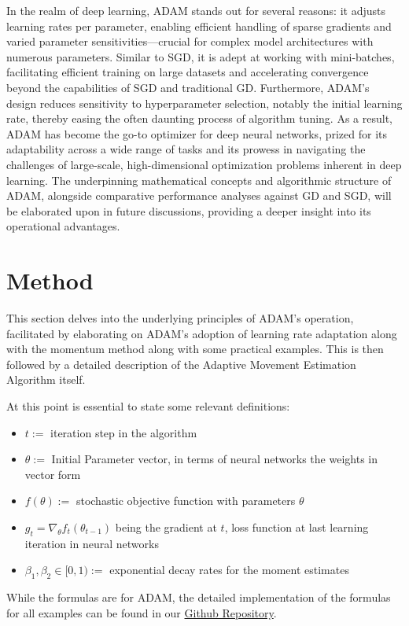 \documentclass[oneside]{article}
\begin{document}
In the realm of deep learning, ADAM stands out for several reasons: it adjusts learning rates per parameter, enabling efficient handling of sparse gradients and varied parameter sensitivities—crucial for complex model architectures with numerous parameters. Similar to SGD, it is adept at working with mini-batches, facilitating efficient training on large datasets and accelerating convergence beyond the capabilities of SGD and traditional GD. Furthermore, ADAM's design reduces sensitivity to hyperparameter selection, notably the initial learning rate, thereby easing the often daunting process of algorithm tuning. As a result, ADAM has become the go-to optimizer for deep neural networks, prized for its adaptability across a wide range of tasks and its prowess in navigating the challenges of large-scale, high-dimensional optimization problems inherent in deep learning. The underpinning mathematical concepts and algorithmic structure of ADAM, alongside comparative performance analyses against GD and SGD, will be elaborated upon in future discussions, providing a deeper insight into its operational advantages.


\section{Method}
This section delves into the underlying principles of ADAM's operation, facilitated by elaborating on ADAM's adoption of learning rate adaptation along with the momentum method along with some practical examples. This is then followed by a detailed description of the Adaptive Movement Estimation Algorithm itself.\par
At this point is essential to state some relevant definitions:
\begin{itemize}
    \item $t:=$ iteration step in the algorithm
    \item $\theta:=$ Initial Parameter vector, in terms of neural networks the weights in vector form
    \item $f(\theta):=$ stochastic objective function with parameters $\theta$
    \item $g_t= \nabla_{\theta} f_t(\theta_{t-1})$ being the gradient at $t$, loss function at last learning iteration in neural networks
    \item $\beta_1, \beta_2 \in [0,1) :=$ exponential decay rates for the moment estimates
\end{itemize}
While the formulas are for ADAM, the detailed implementation of the formulas for all examples can be found in our \href{https://github.com/jakthehut/ADAM-Optimizer}{Github Repository}.
\end{document}
